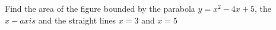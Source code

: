 
%
%
%
%
% 
% 

\question[2] Find the area of the figure bounded by the parabola $y=x^2-4x+5$,
the $x-axis$ and the straight lines $x=3$ and $x=5$


